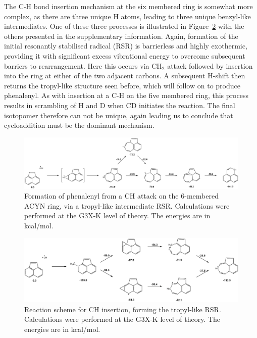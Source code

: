 \documentclass[journal=jacsat,manuscript=article,layout=onecolumn]{achemso}
\begin{document}
The C-H bond insertion mechanism at the six membered ring is somewhat more complex, as there are three unique H atoms, leading to three unique benzyl-like intermediates. One of these three processes is illustrated in Figure~\ref{fig7} with the others presented in the supplementary information. Again, formation of the initial resonantly stabilised radical (RSR) is barrierless and highly exothermic, providing it with significant excess vibrational energy to overcome subsequent barriers to rearrangement. Here this occurs via CH$_2$ attack followed by insertion into the ring at either of the two adjacent carbons. A subsequent H-shift then returns the tropyl-like structure seen before, which will follow on to produce phenalenyl. As with insertion at a C-H on the five membered ring, this process results in scrambling of H and D when CD initiates the reaction. The final isotopomer therefore can not be unique, again leading us to conclude that cycloaddition must be the dominant mechanism. %

\begin{figure}[h!]
	\includegraphics[width=1\textwidth]{Figures/Figure6}
	\caption{Formation of phenalenyl from a CH attack on the 6-membered ACYN ring, via a tropyl-like intermediate RSR. Calculations were performed at the G3X-K level of theory. The energies are in kcal/mol.}
	\label{fig6}
\end{figure}

\begin{figure}[h!]
	\includegraphics[width=1\textwidth]{Figures/Figure7}
	\caption{Reaction scheme for CH insertion, forming the tropyl-like RSR. Calculations were performed at the G3X-K level of theory. The energies are in kcal/mol.}
	\label{fig7}
\end{figure}
\end{document}
